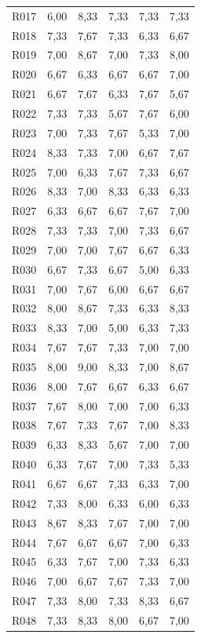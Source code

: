 {\begin{longtable}{L{1.05cm}R{2.05cm}R{1.9cm}R{2.15cm}R{1.7cm}R{1.95cm}}
R017 & 6,00 & 8,33 & 7,33 & 7,33 & 7,33 \\
R018 & 7,33 & 7,67 & 7,33 & 6,33 & 6,67 \\
R019 & 7,00 & 8,67 & 7,00 & 7,33 & 8,00 \\
R020 & 6,67 & 6,33 & 6,67 & 6,67 & 7,00 \\
R021 & 6,67 & 7,67 & 6,33 & 7,67 & 5,67 \\
R022 & 7,33 & 7,33 & 5,67 & 7,67 & 6,00 \\
R023 & 7,00 & 7,33 & 7,67 & 5,33 & 7,00 \\
R024 & 8,33 & 7,33 & 7,00 & 6,67 & 7,67 \\
R025 & 7,00 & 6,33 & 7,67 & 7,33 & 6,67 \\
R026 & 8,33 & 7,00 & 8,33 & 6,33 & 6,33 \\
R027 & 6,33 & 6,67 & 6,67 & 7,67 & 7,00 \\
R028 & 7,33 & 7,33 & 7,00 & 7,33 & 6,67 \\
R029 & 7,00 & 7,00 & 7,67 & 6,67 & 6,33 \\
R030 & 6,67 & 7,33 & 6,67 & 5,00 & 6,33 \\
R031 & 7,00 & 7,67 & 6,00 & 6,67 & 6,67 \\
R032 & 8,00 & 8,67 & 7,33 & 6,33 & 8,33 \\
R033 & 8,33 & 7,00 & 5,00 & 6,33 & 7,33 \\
R034 & 7,67 & 7,67 & 7,33 & 7,00 & 7,00 \\
R035 & 8,00 & 9,00 & 8,33 & 7,00 & 8,67 \\
R036 & 8,00 & 7,67 & 6,67 & 6,33 & 6,67 \\
R037 & 7,67 & 8,00 & 7,00 & 7,00 & 6,33 \\
R038 & 7,67 & 7,33 & 7,67 & 7,00 & 8,33 \\
R039 & 6,33 & 8,33 & 5,67 & 7,00 & 7,00 \\
R040 & 6,33 & 7,67 & 7,00 & 7,33 & 5,33 \\
R041 & 6,67 & 6,67 & 7,33 & 6,33 & 7,00 \\
R042 & 7,33 & 8,00 & 6,33 & 6,00 & 6,33 \\
R043 & 8,67 & 8,33 & 7,67 & 7,00 & 7,00 \\
R044 & 7,67 & 6,67 & 6,67 & 7,00 & 6,33 \\
R045 & 6,33 & 7,67 & 7,00 & 7,33 & 6,33 \\
R046 & 7,00 & 6,67 & 7,67 & 7,33 & 7,00 \\
R047 & 7,33 & 8,00 & 7,33 & 8,33 & 6,67 \\
R048 & 7,33 & 8,33 & 8,00 & 6,67 & 7,00 \\

\end{longtable}}
